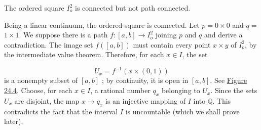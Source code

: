 \begin{centeredblock}
\begin{example}
\label{ex:\thesection.\theexample}
 The ordered square \(I_o^{2}\) is connected but not path connected.

Being a linear continuum, the ordered square is connected. Let \(p = 0 \times 0\) and \(q =\) \(1 \times 1\). We suppose there is a path \(f : [ {a,b}] \rightarrow {I}_o^{2}\) joining \(p\) and \(q\) and derive a contradiction. The image set \(f( [ {a,b}] )\) must contain every point \(x \times y\) of \(I_o^{2}\), by the intermediate value theorem. Therefore, for each \(x \in I\), the set

\[
U_{x} = f^{-1}( {x \times ( {0,1}) })
\]
is a nonempty subset of \([ {a,b}]\) ; by continuity, it is open in \([ {a,b}]\). See \hyperref[fig:24.4]{Figure 24.4}. Choose, for each \(x \in I\), a rational number \(q_{x}\) belonging to \(U_{x}\). Since the sets \(U_{x}\) are disjoint, the map \(x \rightarrow {q}_{x}\) is an injective mapping of \(I\) into \(\mathbb{Q}\). This contradicts the fact that the interval \(I\) is uncountable (which we shall prove later).
\end{example}
\end{centeredblock}

